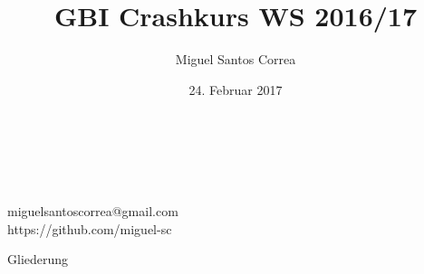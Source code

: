 \documentclass[18pt]{beamer}
\title[GBI Crashkurs]{GBI Crashkurs WS 2016/17}
\author{Miguel Santos Correa}
\date{24. Februar 2017}
\makeatletter
\newcommand*{\currentname}{\@currentlabelname}
\makeatother
\begin{document}

\begin{frame}
  \begin{center}
    \huge\inserttitle\\
    \vskip 1.75mm
    \normalsize
    \insertauthor\\
    \insertdate\\
    \vskip 1.75mm
    \large
    miguelsantoscorrea@gmail.com\\
    \vskip 1.75mm
    https://github.com/miguel-sc
  \end{center}
\end{frame}

\begin{frame}{Gliederung}
  \tableofcontents
\end{frame}

\AtBeginSection[]
{
  \begin{frame}
    \begin{center}
      \huge \currentname
    \end{center}
  \end{frame}
}





\end{document}
